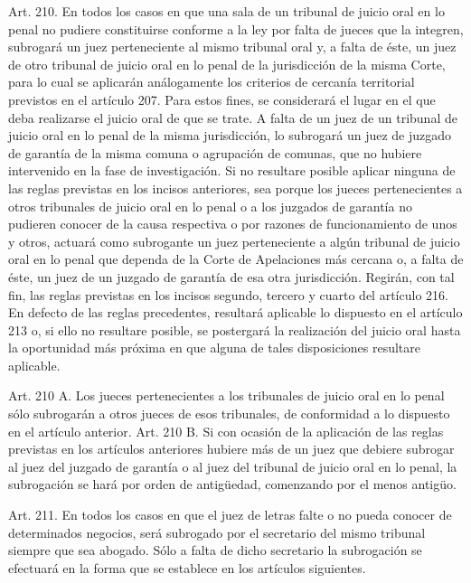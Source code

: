     Art. 210. En todos los casos en que una sala de un tribunal de juicio oral en lo penal no pudiere constituirse conforme a la ley por falta de jueces que la integren, subrogará un juez perteneciente al mismo tribunal oral y, a falta de éste, un juez de otro tribunal de juicio oral en lo penal de la jurisdicción de la misma Corte, para lo cual se aplicarán análogamente los criterios de cercanía territorial previstos en el artículo 207. Para estos fines, se considerará el lugar en el que deba realizarse el juicio oral de que se trate.
    A falta de un juez de un tribunal de juicio oral en lo penal de la misma jurisdicción, lo subrogará un juez de juzgado de garantía de la misma comuna o agrupación de comunas, que no hubiere intervenido en la fase de investigación.
    Si no resultare posible aplicar ninguna de las reglas previstas en los incisos anteriores, sea porque los jueces pertenecientes a otros tribunales de juicio oral en lo penal o a los juzgados de garantía no pudieren conocer de la causa respectiva o por razones de funcionamiento de unos y otros, actuará como subrogante un juez perteneciente a algún tribunal de juicio oral en lo penal que dependa de la Corte de Apelaciones más cercana o, a falta de éste, un juez de un juzgado de garantía de esa otra jurisdicción. Regirán, con tal fin, las reglas previstas en los incisos segundo, tercero y cuarto del artículo 216.
    En defecto de las reglas precedentes, resultará aplicable lo dispuesto en el artículo 213 o, si ello no resultare posible, se postergará la realización del juicio oral hasta la oportunidad más próxima en que alguna de tales disposiciones resultare aplicable.


    Art. 210 A. Los jueces pertenecientes a los tribunales de juicio oral en lo penal sólo subrogarán a otros jueces de esos tribunales, de conformidad a lo dispuesto en el artículo anterior.
    Art. 210 B. Si con ocasión de la aplicación de las reglas previstas en los artículos anteriores hubiere más de un juez que debiere subrogar al juez del juzgado de garantía o al juez del tribunal de juicio oral en lo penal, la subrogación se hará por orden de antigüedad, comenzando por el menos antigüo.


    Art. 211. En todos los casos en que el juez de letras falte o no pueda conocer de determinados negocios, será subrogado por el secretario del mismo tribunal siempre que sea abogado.
    Sólo a falta de dicho secretario la subrogación se efectuará en la forma que se establece en los artículos siguientes.


